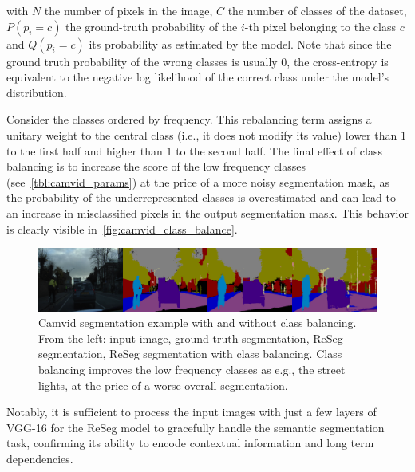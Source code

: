\noindent with $N$ the number of pixels in the image, $C$ the number of classes
of the dataset, $P(p_i=c)$ the ground-truth probability of the $i$-th pixel
belonging to the class $c$ and $Q(p_i=c)$ its probability as estimated by the
model. Note that since the ground truth probability of the wrong classes is
usually $0$, the cross-entropy is equivalent to the negative log likelihood of
the correct class under the model's distribution.

Consider the classes ordered by frequency. This rebalancing term assigns a
unitary weight to the central class (i.e., it does not modify its value) lower
than $1$ to the first half and higher than $1$ to the second half. The final
effect of class balancing is to increase the score of the low frequency classes
(see~\autoref{tbl:camvid_params}) at the price of a more noisy segmentation
mask, as the probability of the underrepresented classes is overestimated and
can lead to an increase in misclassified pixels in the output segmentation
mask. This behavior is clearly visible in~\autoref{fig:camvid_class_balance}.

\begin{figure}[t]
    \centering
    \includegraphics[width=\textwidth]{img/reseg/samples/camvid_classbal_diff.png}
    \caption{Camvid segmentation example with and without class balancing. From
        the left: input image, ground truth segmentation, ReSeg segmentation,
        ReSeg segmentation with class balancing. Class balancing improves the
        low frequency classes as e.g., the street lights, at the price of a
        worse overall segmentation.}
    \label{fig:camvid_class_balance}
\end{figure}

%
Notably, it is sufficient to process the input images with just a few layers of
VGG-16 for the ReSeg model to gracefully handle the semantic segmentation task,
confirming its ability to encode contextual information and long term
dependencies.

